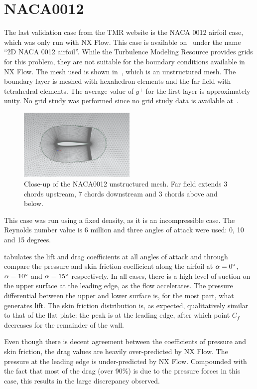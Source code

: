 \section{NACA0012}
The last validation case from the TMR website is the NACA 0012 airfoil case, which was only run with NX Flow. This case is available on~\cite{tmr} under the name ``2D NACA 0012 airfoil''. While the Turbulence Modeling Resource provides grids for this problem, they are not suitable for the boundary conditions available in NX Flow. The mesh used is shown in~, which is an unstructured mesh. The boundary layer is meshed with hexahedron elements and the far field with tetrahedral elements. The average value of $y^+$ for the first layer is approximately unity. No grid study was performed since no grid study data is available at~\cite{tmr}.
\begin{figure}
    \centering
    \includegraphics[width=0.5\textwidth]{figs/naca0012/naca0012.png}
    \caption{Close-up of the NACA0012 unstructured mesh. Far field extends 3 chords upstream, 7 chords downstream and 3 chords above and below.}
    \label{fig:naca0012}
\end{figure}
This case was run using a fixed density, as it is an incompressible case. The Reynolds number value is 6 million and three angles of attack were used: 0, 10 and 15 degrees.

 tabulates the lift and drag coefficients at all angles of attack and  through  compare the pressure and skin friction coefficient along the airfoil at $\alpha=0^\circ$, $\alpha=10^\circ$ and $\alpha=15^\circ$ respectively. In all cases, there is a high level of suction on the upper surface at the leading edge, as the flow accelerates. The pressure differential between the upper and lower surface is, for the most part, what generates lift. The skin friction distribution is, as expected, qualitatively similar to that of the flat plate: the peak is at the leading edge, after which point $C_f$ decreases for the remainder of the wall.

Even though there is decent agreement between the coefficients of pressure and skin friction, the drag values are heavily over-predicted by NX Flow. The pressure at the leading edge is under-predicted by NX Flow. Compounded with the fact that most of the drag (over 90\%) is due to the pressure forces in this case, this results in the large discrepancy observed.

